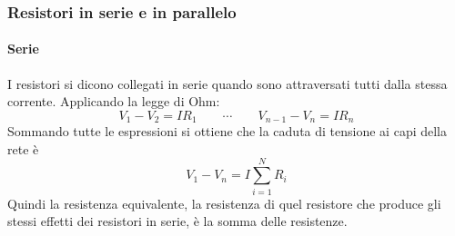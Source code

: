 \subsubsection{Resistori in serie e in parallelo}
\paragraph{Serie}
I resistori si dicono collegati in serie quando sono attraversati tutti dalla stessa corrente. Applicando la legge di Ohm:
\begin{equation*}V_1-V_2=IR_1\qquad \cdots \qquad V_{n-1}-V_{n}=IR_n\end{equation*}
Sommando tutte le espressioni si ottiene che la caduta di tensione ai capi della rete è 
\begin{equation*}V_1-V_n=I\sum_{i=1}^N R_i\end{equation*}
Quindi la resistenza equivalente, la resistenza di quel resistore che produce gli stessi effetti dei resistori in serie, è la somma delle resistenze.
